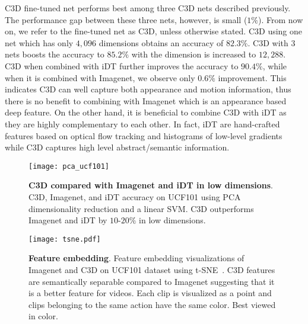 \documentclass[10pt,twocolumn,letterpaper]{article}
\begin{document}
C3D fine-tuned net performs best among three C3D nets described previously. The performance gap between these three nets, however, is small ($1\%$). From now on, we refer to the fine-tuned net as C3D, unless otherwise stated. C3D using one net which has only $4,096$ dimensions obtains an accuracy of $82.3\%$. C3D with $3$ nets boosts the accuracy to $85.2\%$ with the dimension is increased to $12,288$. C3D when combined with iDT further improves the accuracy to $90.4\%$, while when it is combined with Imagenet, we observe only $0.6\%$ improvement. This indicates C3D can well capture both appearance and motion information, thus there is no benefit to combining with Imagenet which is an appearance based deep feature. On the other hand, it is beneficial to combine C3D with iDT as they are highly complementary to each other. In fact, iDT are hand-crafted features based on optical flow tracking and histograms of low-level gradients while C3D captures high level abstract/semantic information. 

\begin{figure}
\begin{center}
   \texttt{[image: pca\_ucf101]}
\end{center}
\vspace{-12pt}
   \caption{{\bf C3D compared with Imagenet and iDT in low dimensions}. C3D, Imagenet, and iDT accuracy on UCF101 using PCA dimensionality reduction and a linear SVM. C3D outperforms Imagenet and iDT by $10$-$20\%$ in low dimensions.}
\label{fig:pca_ucf101}
\end{figure}


\begin{figure}[t]
\begin{center}
   \texttt{[image: tsne.pdf]}
\end{center}
\vspace{-12pt}
   \caption{{\bf Feature embedding}. Feature embedding visualizations of Imagenet and C3D on UCF101 dataset using t-SNE~\cite{van2008visualizing}. C3D features are semantically separable compared to Imagenet suggesting that it is a better feature for videos. Each clip is visualized as a point and clips belonging to the same action have the same color. Best viewed in color.}
\vspace{-16pt}
\label{fig:feature_embbeding}
\end{figure}
\end{document}
